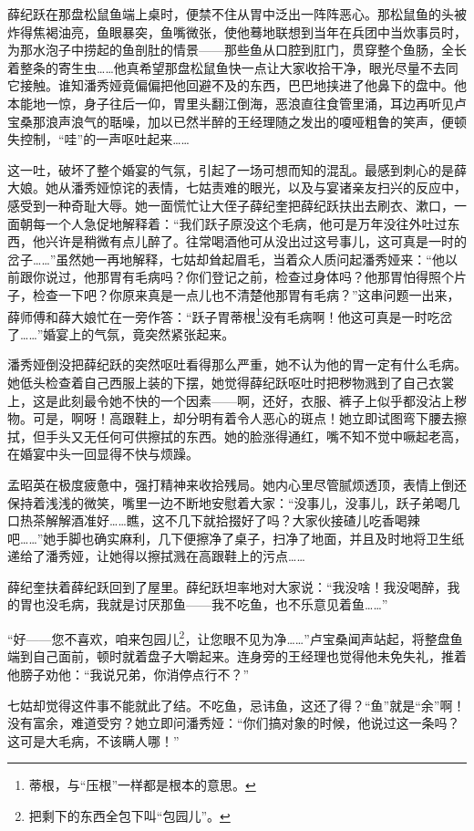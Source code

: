 \par 薛纪跃在那盘松鼠鱼端上桌时，便禁不住从胃中泛出一阵阵恶心。那松鼠鱼的头被炸得焦褐油亮，鱼眼暴突，鱼嘴微张，使他蓦地联想到当年在兵团中当炊事员时，为那水泡子中捞起的鱼剖肚的情景——那些鱼从口腔到肛门，贯穿整个鱼肠，全长着整条的寄生虫……他真希望那盘松鼠鱼快一点让大家收拾干净，眼光尽量不去同它接触。谁知潘秀娅竟偏偏把他回避不及的东西，巴巴地挟进了他鼻下的盘中。他本能地一惊，身子往后一仰，胃里头翻江倒海，恶浪直往食管里涌，耳边再听见卢宝桑那浪声浪气的聒噪，加以已然半醉的王经理随之发出的嗄哑粗鲁的笑声，便顿失控制，“哇”的一声呕吐起来……
\par 这一吐，破坏了整个婚宴的气氛，引起了一场可想而知的混乱。最感到刺心的是薛大娘。她从潘秀娅惊诧的表情，七姑责难的眼光，以及与宴诸亲友扫兴的反应中，感受到一种奇耻大辱。她一面慌忙让大侄子薛纪奎把薛纪跃扶出去刷衣、漱口，一面朝每一个人急促地解释着：“我们跃子原没这个毛病，他可是万年没往外吐过东西，他兴许是稍微有点儿醉了。往常喝酒他可从没出过这号事儿，这可真是一时的岔子……”虽然她一再地解释，七姑却耸起眉毛，当着众人质问起潘秀娅来：“他以前跟你说过，他那胃有毛病吗？你们登记之前，检查过身体吗？他那胃怕得照个片子，检查一下吧？你原来真是一点儿也不清楚他那胃有毛病？”这串问题一出来，薛师傅和薛大娘忙在一旁作答：“跃子胃蒂根\footnote{蒂根，与“压根”一样都是根本的意思。}没有毛病啊！他这可真是一时吃岔了……”婚宴上的气氛，竟突然紧张起来。
\par 潘秀娅倒没把薛纪跃的突然呕吐看得那么严重，她不认为他的胃一定有什么毛病。她低头检查着自己西服上装的下摆，她觉得薛纪跃呕吐时把秽物溅到了自己衣裳上，这是此刻最令她不快的一个因素——啊，还好，衣服、裤子上似乎都没沾上秽物。可是，啊呀！高跟鞋上，却分明有着令人恶心的斑点！她立即试图弯下腰去擦拭，但手头又无任何可供擦拭的东西。她的脸涨得通红，嘴不知不觉中噘起老高，在婚宴中头一回显得不快与烦躁。
\par 孟昭英在极度疲惫中，强打精神来收拾残局。她内心里尽管腻烦透顶，表情上倒还保持着浅浅的微笑，嘴里一边不断地安慰着大家：“没事儿，没事儿，跃子弟喝几口热茶解解酒准好……瞧，这不几下就拾掇好了吗？大家伙接碴儿吃香喝辣吧……”她手脚也确实麻利，几下便擦净了桌子，扫净了地面，并且及时地将卫生纸递给了潘秀娅，让她得以擦拭溅在高跟鞋上的污点……
\par 薛纪奎扶着薛纪跃回到了屋里。薛纪跃坦率地对大家说：“我没啥！我没喝醉，我的胃也没毛病，我就是讨厌那鱼——我不吃鱼，也不乐意见着鱼……”
\par “好——您不喜欢，咱来包园儿\footnote{把剩下的东西全包下叫“包园儿”。}，让您眼不见为净……”卢宝桑闻声站起，将整盘鱼端到自己面前，顿时就着盘子大嚼起来。连身旁的王经理也觉得他未免失礼，推着他膀子劝他：“我说兄弟，你消停点行不？”
\par 七姑却觉得这件事不能就此了结。不吃鱼，忌讳鱼，这还了得？“鱼”就是“余”啊！没有富余，难道受穷？她立即问潘秀娅：“你们搞对象的时候，他说过这一条吗？这可是大毛病，不该瞒人哪！”
